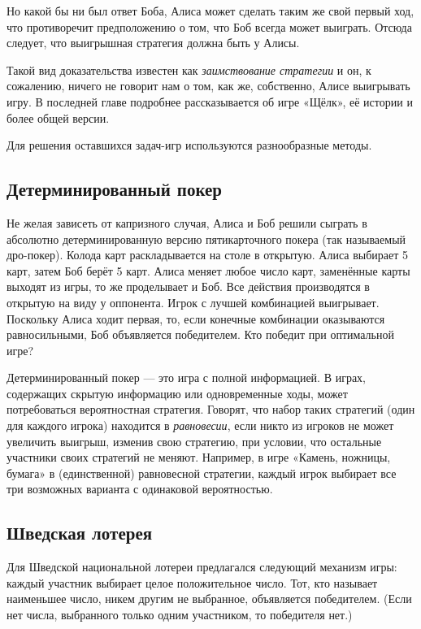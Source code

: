 Но какой бы ни был ответ Боба, Алиса может сделать таким же свой первый ход, что противоречит предположению о том, что Боб всегда может выиграть.
Отсюда следует,
что выигрышная стратегия должна быть у Алисы.
\heart

Такой вид доказательства известен как \emph{заимствование стратегии} и он, к сожалению, ничего не говорит нам о том, как же, собственно, Алисе выигрывать игру.
В последней главе подробнее рассказывается об игре «Щёлк», её истории и более общей версии.

\medskip

Для решения оставшихся задач-игр используются разнообразные методы.

\subsection*{Детерминированный покер}%

Не желая зависеть от капризного случая, Алиса и Боб решили сыграть в абсолютно детерминированную версию пятикарточного покера (так называемый дро-покер).
Колода карт раскладывается на столе в открытую.
Алиса выбирает 5 карт, затем Боб берёт 5 карт.
Алиса меняет любое число карт, заменённые карты выходят из игры, то же проделывает и Боб.
Все действия производятся в открытую на виду у оппонента.
Игрок с лучшей комбинацией выигрывает.
Поскольку Алиса ходит первая, то, если конечные комбинации оказываются равносильными, Боб объявляется победителем.
Кто победит при оптимальной игре?

\medskip

Детерминированный покер --- это игра с полной информацией.
В играх, содержащих скрытую информацию или одновременные ходы, может потребоваться вероятностная стратегия.
Говорят, что набор таких стратегий (один для каждого игрока) находится в \emph{равновесии}, если никто из игроков не может увеличить выигрыш, изменив свою стратегию, при условии, что остальные участники своих стратегий не меняют.
Например, в игре «Камень, ножницы, бумага» в (единственной) равновесной стратегии, каждый игрок выбирает все три возможных варианта с одинаковой вероятностью.

\subsection*{Шведская лотерея}%

Для Шведской национальной лотереи предлагался следующий механизм игры: каждый участник выбирает целое положительное число.
Тот, кто называет наименьшее число, никем другим не выбранное, объявляется победителем.
(Если нет числа, выбранного только одним участником, то победителя нет.)

